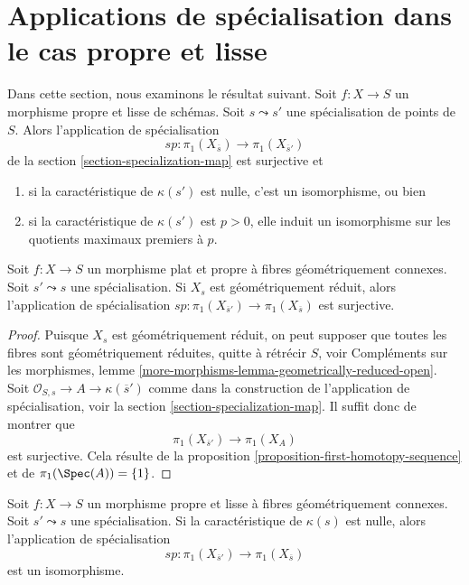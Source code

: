 \section{Applications de spécialisation dans le cas propre et lisse}
\label{section-specialization-smooth-proper}

\noindent
Dans cette section, nous examinons le résultat suivant.
Soit $f : X \to S$ un morphisme propre et lisse de schémas.
Soit $s \leadsto s'$ une spécialisation de points de $S$.
Alors l'application de spécialisation
$$
sp : \pi_1(X_{\overline{s}}) \longrightarrow \pi_1(X_{\overline{s}'})
$$
de la section \ref{section-specialization-map}
est surjective et
\begin{enumerate}
\item si la caractéristique de $\kappa(s')$ est nulle, c'est
un isomorphisme, ou bien
\item si la caractéristique de $\kappa(s')$ est $p > 0$, elle
induit un isomorphisme sur les quotients maximaux premiers à $p$.
\end{enumerate}

\begin{lemma}
\label{lemma-specialization-map-surjective}
Soit $f : X \to S$ un morphisme plat et propre à fibres géométriquement
connexes. Soit $s' \leadsto s$ une spécialisation.
Si $X_s$ est géométriquement réduit, alors l'application de
spécialisation $sp : \pi_1(X_{\overline{s}'}) \to \pi_1(X_{\overline{s}})$
est surjective.
\end{lemma}

\begin{proof}
Puisque $X_s$ est géométriquement réduit, on peut supposer que toutes les
fibres sont géométriquement réduites, quitte à rétrécir $S$, voir
Compléments sur les morphismes, lemme \ref{more-morphisms-lemma-geometrically-reduced-open}.
Soit $\mathcal{O}_{S, s} \to A \to \kappa(\overline{s}')$ comme
dans la construction de l'application de spécialisation, voir la
section \ref{section-specialization-map}.
Il suffit donc de montrer que
$$
\pi_1(X_{\overline{s}'}) \to \pi_1(X_A)
$$
est surjective. Cela résulte de la
proposition \ref{proposition-first-homotopy-sequence}
et de $\pi_1(\Spec(A)) = \{1\}$.
\end{proof}

\begin{proposition}
\label{proposition-specialization-map-isomorphism}
Soit $f : X \to S$ un morphisme propre et lisse à fibres géométriquement
connexes. Soit $s' \leadsto s$ une spécialisation.
Si la caractéristique de $\kappa(s)$ est nulle, alors l'application de
spécialisation
$$
sp : \pi_1(X_{\overline{s}'}) \to \pi_1(X_{\overline{s}})
$$
est un isomorphisme.
\end{proposition}

